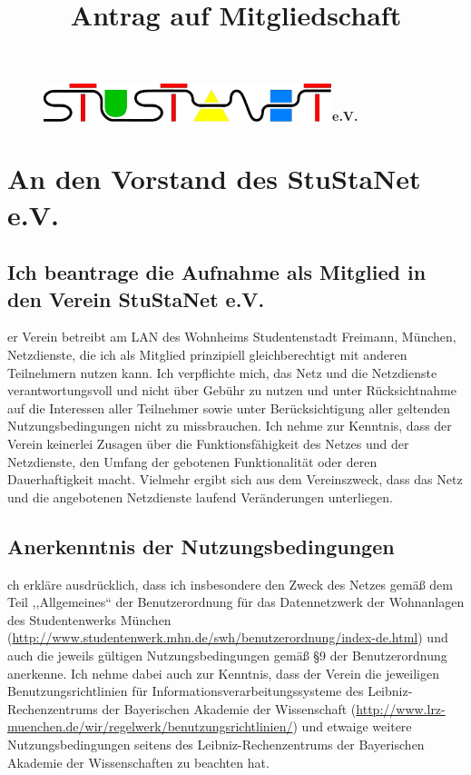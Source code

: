 \documentclass[a4paper,14pt]{scrartcl}
\title{Antrag auf Mitgliedschaft}
\date{}
\begin{document}
\frakfamily
\fraklines

\maketitle
\vspace{-60pt}

\begin{figure}[t!]
   \centering
   \mbox{\includegraphics[width=0.75\textwidth,keepaspectratio]{stunetp}\Huge \frakfamily \textbf{e.V.}}
   \vspace{-40pt}
\end{figure}


\section*{An den Vorstand des StuStaNet e.V.}

\subsection*{Ich beantrage die Aufnahme als Mitglied in den Verein StuStaNet e.V.}
er Verein betreibt am LAN des Wohnheims Studentenstadt Freimann, München, Netzdienste, die ich als Mitglied prinzipiell gleichberechtigt mit anderen Teilnehmern nutzen kann. Ich verpflichte mich, das Netz und die Netzdienste verantwortungsvoll und nicht über Gebühr zu nutzen und unter Rücksichtnahme auf die Interessen aller Teilnehmer sowie unter Berücksichtigung aller geltenden Nutzungsbedingungen nicht zu missbrauchen. Ich nehme zur Kenntnis, dass der Verein keinerlei Zusagen über die Funktionsfähigkeit des Netzes und der Netzdienste, den Umfang der gebotenen Funktionalität oder deren Dauerhaftigkeit macht. Vielmehr ergibt sich aus dem Vereinszweck, dass das Netz und die angebotenen Netzdienste laufend Veränderungen unterliegen.

\subsection*{Anerkenntnis der Nutzungsbedingungen}
ch erkläre ausdrücklich, dass ich insbesondere den Zweck des Netzes gemäß dem Teil ,,Allgemeines`` der Benutzerordnung für das Datennetzwerk der Wohnanlagen des Studentenwerks München (\url{http://www.studentenwerk.mhn.de/swh/benutzerordnung/index-de.html}) 
und auch die jeweils gültigen Nutzungsbedingungen gemäß §9 der Benutzerordnung anerkenne. Ich nehme dabei auch zur Kenntnis, dass der Verein die jeweiligen Benutzungsrichtlinien für Informationsverarbeitungssysteme des Leibniz-Rechenzentrums der Bayerischen Akademie der Wissenschaft (\url{http://www.lrz-muenchen.de/wir/regelwerk/benutzungsrichtlinien/}) 
und etwaige weitere Nutzungsbedingungen seitens des Leibniz-Rechenzentrums der Bayerischen Akademie der Wissenschaften zu beachten hat.
\end{document}
